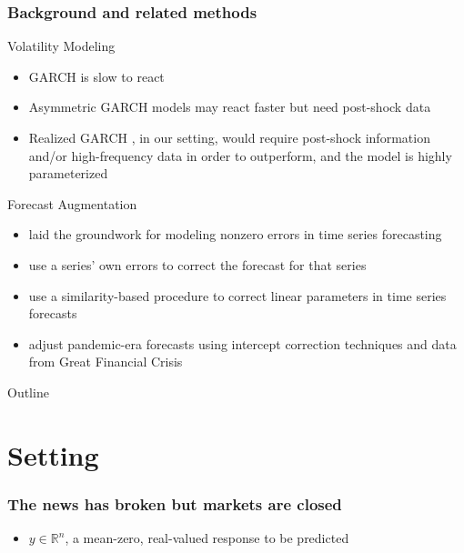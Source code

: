 \documentclass{beamer}
\begin{document}
\begin{frame}
    \frametitle{Background and related methods}
    Volatility Modeling

    \begin{itemize}
        \item GARCH is slow to react \parencite[][]{andersen2003modeling}
        \item Asymmetric GARCH models may react faster but need post-shock data
        \item Realized GARCH \parencite[][]{hansen2012realized}, in our setting, would require post-shock information and/or high-frequency data in order to outperform, and the model is highly parameterized
    \end{itemize}

    Forecast Augmentation
    \begin{itemize}
        \item \cite[][]{clements1996intercept,clements1998forecasting} laid the groundwork for modeling nonzero errors in time series forecasting
        \item \cite[][]{guerron2017macroeconomic} use a series' own errors to correct the forecast for that series
        \item \cite[][]{dendramis2020similarity} use a similarity-based procedure to correct linear parameters in time series forecasts
        \item \cite[][]{foroni2022forecasting} adjust pandemic-era forecasts using intercept correction techniques and data from Great Financial Crisis
    \end{itemize}
\end{frame}

\begin{frame}{Outline}
    \tableofcontents
\end{frame}

\section{Setting}

\begin{frame}
\frametitle{The news has broken but markets are closed}

\begin{itemize}
\item $y\in \mathbb{R}^{n}$, a mean-zero, real-valued response to be predicted

\end{itemize}
\end{frame}
\end{document}
